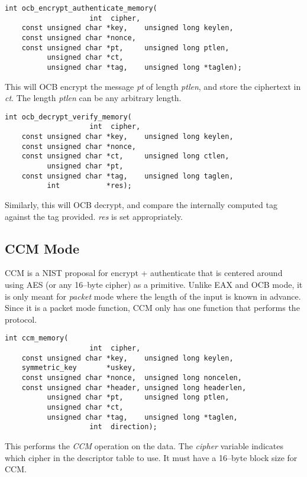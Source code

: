 \documentclass[synpaper]{book}
\begin{document}
\begin{verbatim}
int ocb_encrypt_authenticate_memory(
                    int  cipher,
    const unsigned char *key,    unsigned long keylen,
    const unsigned char *nonce,  
    const unsigned char *pt,     unsigned long ptlen,
          unsigned char *ct,
          unsigned char *tag,    unsigned long *taglen);
\end{verbatim}

This will OCB encrypt the message \textit{pt} of length \textit{ptlen}, and store the ciphertext in \textit{ct}.  The length \textit{ptlen}
can be any arbitrary length.  

\begin{verbatim}
int ocb_decrypt_verify_memory(
                    int  cipher,
    const unsigned char *key,    unsigned long keylen,
    const unsigned char *nonce,  
    const unsigned char *ct,     unsigned long ctlen,
          unsigned char *pt,
    const unsigned char *tag,    unsigned long taglen,
          int           *res);
\end{verbatim}

Similarly, this will OCB decrypt, and compare the internally computed tag against the tag provided. \textit{res} is set 
appropriately.

\subsection{CCM Mode}
CCM is a NIST proposal for encrypt + authenticate that is centered around using AES (or any 16--byte cipher) as a primitive.  Unlike EAX and OCB mode,
it is only meant for \textit{packet} mode where the length of the input is known in advance.  Since it is a packet mode function, CCM only has one 
function that performs the protocol.

\begin{verbatim}
int ccm_memory(
                    int  cipher,
    const unsigned char *key,    unsigned long keylen,
    symmetric_key       *uskey,
    const unsigned char *nonce,  unsigned long noncelen,
    const unsigned char *header, unsigned long headerlen,
          unsigned char *pt,     unsigned long ptlen,
          unsigned char *ct,
          unsigned char *tag,    unsigned long *taglen,
                    int  direction);
\end{verbatim}

This performs the \textit{CCM} operation on the data.  The \textit{cipher} variable indicates which cipher in the descriptor table to use.  It must have a 
16--byte block size for CCM.  
\end{document}
